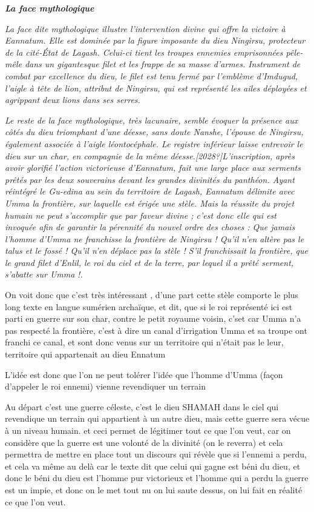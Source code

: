 \documentclass[a4paper,10pt]{article}
\begin{document}
\textbf{\textit{La face {\textquotedbl}mythologique{\textquotedbl}}}

\textit{La face dite {\textquotedbl}mythologique{\textquotedbl} illustre
l'intervention divine qui offre la victoire à
Eannatum. Elle est dominée par la figure imposante du dieu Ningirsu,
protecteur de la cité-État de Lagash. Celui-ci tient les troupes
ennemies emprisonnées pêle-mêle dans un gigantesque filet et les frappe
de sa masse d'armes. Instrument de combat par
excellence du dieu, le filet est tenu fermé par
l'emblème d'Imdugud,
l'aigle à tête de lion, attribut de Ningirsu, qui est
représenté les ailes déployées et agrippant deux lions dans ses
serres.}

\textit{Le reste de la face {\textquotedbl}mythologique{\textquotedbl},
très lacunaire, semble évoquer la présence aux côtés du dieu triomphant
d'une déesse, sans doute Nanshe,
l'épouse de Ningirsu, également associée à
l'aigle léontocéphale. Le registre inférieur laisse
entrevoir le dieu sur un char, en compagnie de la même
déesse.[2028?]L'inscription, après avoir glorifié
l'action victorieuse d'Eannatum, fait
une large place aux serments prêtés par les deux souverains devant les
grandes divinités du panthéon. Ayant réintégré le Gu-edina au sein du
territoire de Lagash, Eannatum délimite avec Umma la frontière, sur
laquelle est érigée une stèle. Mais la réussite du projet humain ne
peut s'accomplir que par faveur divine ;
c'est donc elle qui est invoquée afin de garantir la
pérennité du nouvel ordre des choses : {\textquotedbl}}\textit{Que
jamais l'homme d'Umma ne franchisse
la frontière de Ningirsu ! Qu'il n'en
altère pas le talus et le fossé ! Qu'il
n'en déplace pas la stèle ! S'il
franchissait la frontière, que le grand filet d'Enlil,
le roi du ciel et de la terre, par lequel il a prêté serment,
s'abatte sur Umma }\textit{!{\textquotedbl}.}

On voit donc que c'est très intéressant ,
d'une part cette stèle comporte le plus long texte en
langue sumérien archaïque, et dit, que si le roi représenté ici est
parti en guerre sur son char, contre le petit royaume voisin, 
c'set car Umma n'a pas respecté la
frontière, c'est à dire un canal
d'irrigation Umma et sa troupe ont franchi ce canal,
et sont donc venus sur un territoire qui n'était pas
le leur, territoire qui appartenait au dieu Ennatum

L'idée est donc que l'on ne peut
tolérer l'idée que l'homme
d'Umma (façon d'appeler le roi
ennemi) vienne revendiquer un terrain 

Au départ c'est une guerre céleste,
c'est le dieu SHAMAH dans le ciel qui revendique un
terrain qui appartient à un autre dieu, mais cette guerre sera vécue à
un niveau humain. et ceci permet de légitimer tout ce que
l'on veut, car on considère que la guerre est une
volonté de la divinité (on le reverra) et cela permettra de mettre en
place tout un discours qui révèle que si l'ennemi a
perdu, et cela va même au delà car le texte dit que celui qui gagne est
béni du dieu, et donc le béni du dieu est l'homme pur
victorieux et l'homme qui a perdu la guerre est un
impie, et donc on le met tout nu on lui saute dessus, on lui fait en
réalité ce que l'on veut. 
\end{document}
